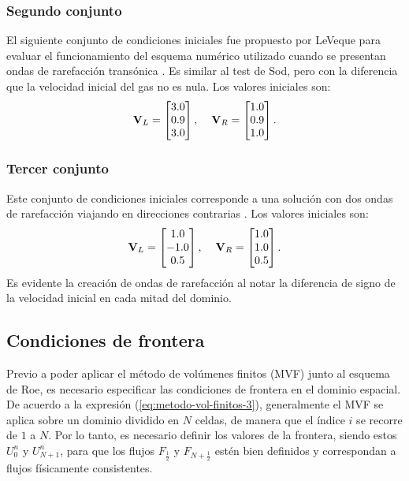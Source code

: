 \subsubsection{Segundo conjunto}
El siguiente conjunto de condiciones iniciales fue propuesto por LeVeque para evaluar el funcionamiento del esquema numérico utilizado cuando se presentan ondas de rarefacción transónica \cite{pelanti}. Es similar al test de Sod, pero con la diferencia que la velocidad inicial del gas no es nula. Los valores iniciales son:
\begin{equation}
	\mathbf{V}_L = 
	\begin{bmatrix}
		3.0\\
		0.9\\
		3.0
	\end{bmatrix},\hspace{4mm}
	\mathbf{V}_R = 
	\begin{bmatrix}
		1.0\\
		0.9\\
		1.0
	\end{bmatrix}.
\end{equation}
\subsubsection{Tercer conjunto}
\label{sec:tercer-conjunto}
Este conjunto de condiciones iniciales corresponde a una solución con dos ondas de rarefacción viajando en direcciones contrarias \cite{thesis-euler-godunov}. Los valores iniciales son:
\begin{equation}
	\mathbf{V}_L = 
	\begin{bmatrix}
		1.0\\
		-1.0\\
		0.5
	\end{bmatrix},\hspace{4mm}
	\mathbf{V}_R = 
	\begin{bmatrix}
		1.0\\
		1.0\\
		0.5
	\end{bmatrix}.
\end{equation}
Es evidente la creación de ondas de rarefacción al notar la diferencia de signo de la velocidad inicial en cada mitad del dominio.
\subsection{Condiciones de frontera}
Previo a poder aplicar el método de volúmenes finitos (MVF) junto al esquema de Roe, es necesario especificar las condiciones de frontera en el dominio espacial.
De acuerdo a la expresión (\ref{eq:metodo-vol-finitos-3}), generalmente el MVF se aplica sobre un dominio dividido en $N$ celdas, de manera que el índice $i$ se recorre de $1$ a $N$. Por lo tanto, es necesario definir los valores de la frontera, siendo estos $U_{0}^{n}$ y $U_{N+1}^{n}$, para que los flujos $F_{\frac{1}{2}}$ y $F_{N+\frac{1}{2}}$ estén bien definidos y correspondan a flujos físicamente consistentes.
